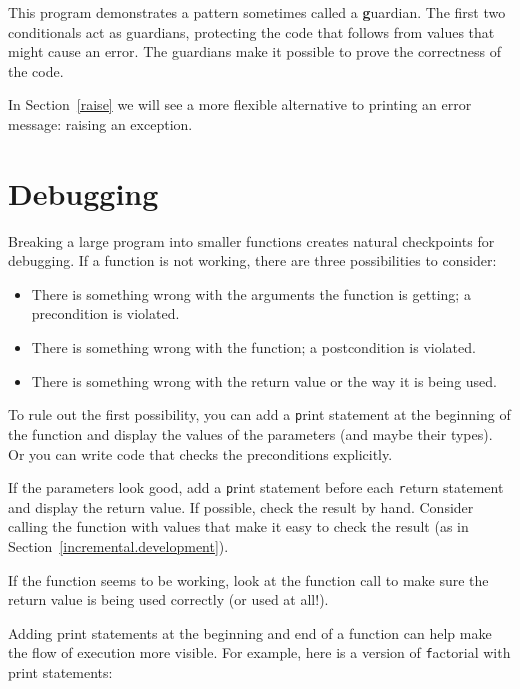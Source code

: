 \documentclass[
DIV=11,
fontsize=12,
twoside,
headinclude=false,
titlepage=firstiscover,
abstract=true,
headsepline=true,
footsepline=true,
chapterprefix=true, %
headings=big,
bibliography=totoc,%
captions=tableheading
]{scrbook}
\theoremstyle{definition}
\begin{document}
This program demonstrates a pattern sometimes called a {\textbf guardian}.
The first two conditionals act as guardians, protecting the code that
follows from values that might cause an error.  The guardians make it
possible to prove the correctness of the code.

In Section~\ref{raise} we will see a more flexible alternative to printing
an error message: raising an exception.


\section{Debugging}
\label{factdebug}

Breaking a large program into smaller functions creates natural
checkpoints for debugging.  If a function is not
working, there are three possibilities to consider:

\begin{itemize}

\item There is something wrong with the arguments the function
is getting; a precondition is violated.

\item There is something wrong with the function; a postcondition
is violated.

\item There is something wrong with the return value or the
way it is being used.

\end{itemize}

To rule out the first possibility, you can add a {\texttt print} statement
at the beginning of the function and display the values of the
parameters (and maybe their types).  Or you can write code
that checks the preconditions explicitly.

If the parameters look good, add a {\texttt print} statement before each
{\texttt return} statement and display the return value.  If
possible, check the result by hand.  Consider calling the
function with values that make it easy to check the result
(as in Section~\ref{incremental.development}).

If the function seems to be working, look at the function call
to make sure the return value is being used correctly (or used
at all!).

Adding print statements at the beginning and end of a function
can help make the flow of execution more visible.
For example, here is a version of {\texttt factorial} with
print statements:
\end{document}
